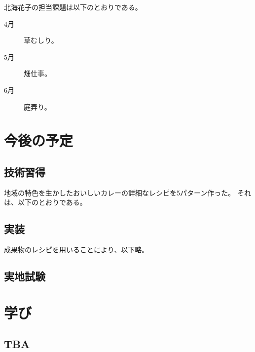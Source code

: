 \documentclass[openany,11pt,papersize]{jsbook}
\begin{document}
北海花子の担当課題は以下のとおりである。 
\begin{description}
 \item[4月] 草むしり。
 \item[5月] 畑仕事。
 \item[6月] 庭弄り。
\end{description}






\chapter{今後の予定}

\section{技術習得}

地域の特色を生かしたおいしいカレーの詳細なレシピを5パターン作った。 
それは、以下のとおりである。


\section{実装}

成果物のレシピを用いることにより、以下略。




\section{実地試験}



\chapter{学び}
\section{TBA}
\end{document}
